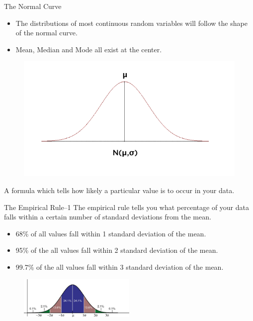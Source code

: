 \begin{frame}[t]{The Normal Curve}
	\begin{itemize}
		\item The distributions of most continuous random variables will follow 
		the shape of the normal curve.
		\item Mean, Median and Mode all exist at the center.
		
	\end{itemize}
\begin{figure} [ht]
	\centering
	\includegraphics[trim={0 1cm 0 0}, clip, scale=0.4]{eda/nd3.png}
\end{figure}
\centering
A formula which tells how likely a particular value is
to occur in your data.
\end{frame}
\begin{frame}[t]{The Empirical Rule--1}
	The empirical rule tells you what percentage of your data falls within a 
	certain number of standard deviations from the mean.
	\begin{itemize}
		\item 68\% of all values fall within 1 standard deviation of the mean.
		\item 95\% of the all values fall within 2 standard deviation of the 
		mean. 
		\item 99.7\% of the all values fall within 3 standard deviation of the 
		mean. 
	\end{itemize}

\begin{figure} [ht]
	\centering
	\includegraphics[width=0.5\textwidth]{eda/standard-normal-distribution.jpg}
\end{figure}
\end{frame}


